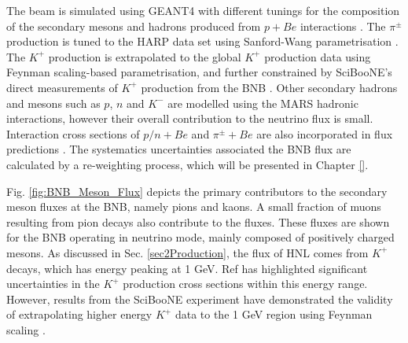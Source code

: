 The beam is simulated using GEANT4 with different tunings for the composition of the secondary mesons and hadrons produced from $p + Be$ interactions \cite{BNBMiniBooNE}.
The $\pi^{\pm}$ production is tuned to the HARP data set using Sanford-Wang parametrisation .
The $K^{+}$ production is extrapolated to the global $K^{+}$ production data using Feynman scaling-based parametrisation, and further constrained by SciBooNE's direct measurements of $K^{+}$ production from the BNB \cite{SciBooNE}. 
Other secondary hadrons and mesons such as $p$, $n$ and $K^{-}$ are modelled using the MARS hadronic interactions, however their overall contribution to the neutrino flux is small. 
Interaction cross sections of $p/n + Be$ and $\pi^{\pm} + Be$ are also incorporated in flux predictions \cite{DavePhd}.   
The systematics uncertainties associated the BNB flux are calculated by a re-weighting process, which will be presented in Chapter \ref{}.

Fig. \ref{fig:BNB_Meson_Flux} depicts the primary contributors to the secondary meson fluxes at the BNB, namely pions and kaons.
A small fraction of muons resulting from pion decays also contribute to the fluxes.
These fluxes are shown for the BNB operating in neutrino mode, mainly composed of positively charged mesons.
As discussed in Sec. \ref{sec2Production}, the flux of HNL comes from $K^{+}$ decays, which has energy peaking at 1 GeV.
Ref \cite{BNBMiniBooNE} has highlighted significant uncertainties in the $K^{+}$ production cross sections within this energy range.
However, results from the SciBooNE experiment have demonstrated the validity of extrapolating higher energy $K^{+}$ data to the 1 GeV region using Feynman scaling \cite{SciBooNE}. 

